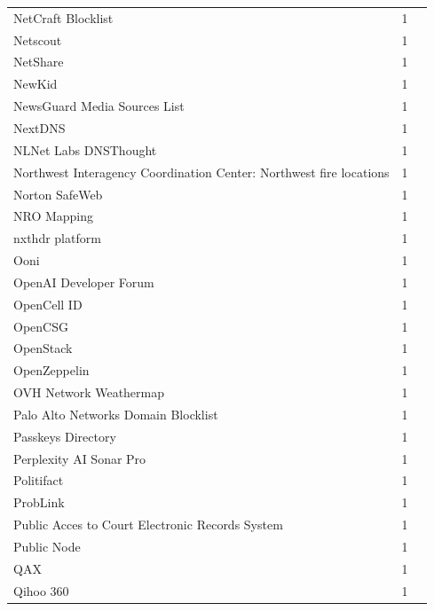 \documentclass[11pt,a4paper]{article}
\begin{document}
\begin{longtable}{@{}p{} p{}p{}@{}}
NetCraft Blocklist & 1 & \cite{10.1007/978-3-030-98785-5_1} \\
Netscout & 1 & \cite{10.1145/3646547.3688451} \\
NetShare & 1 & \cite{10.1145/3777912.3839833} \\
NewKid & 1 & \cite{10.1145/3646547.3688451} \\
NewsGuard Media Sources List & 1 & \cite{10.1145/3487552.3487859} \\
NextDNS & 1 & \cite{10.1145/3730567.3764491} \\
NLNet Labs DNSThought & 1 & \cite{10.1007/978-3-031-28486-1_21} \\
Northwest Interagency Coordination Center: Northwest fire locations & 1 & \cite{10.1007/978-3-031-56252-5_9} \\
Norton SafeWeb & 1 & \cite{10.1145/3777912.3839787} \\
NRO Mapping & 1 & \cite{10.1145/3777912.3809139} \\
nxthdr platform & 1 & \cite{10.1145/3777912.3839828} \\
Ooni & 1 & \cite{10.1007/978-3-030-98785-5_23} \\
OpenAI Developer Forum & 1 & \cite{10.1145/3730567.3732912} \\
OpenCell ID & 1 & \cite{10.1007/978-3-030-72582-2_15} \\
OpenCSG & 1 & \cite{10.1145/3777912.3839799} \\
OpenStack & 1 & \cite{10.1007/978-3-032-18268-5_16} \\
OpenZeppelin & 1 & \cite{10.1145/3777912.3809150} \\
OVH Network Weathermap & 1 & \cite{10.1145/3517745.3561462} \\
Palo Alto Networks Domain Blocklist & 1 & \cite{10.1145/3618257.3624805} \\
Passkeys Directory & 1 & \cite{10.1007/978-3-032-18268-5_15} \\
Perplexity AI Sonar Pro & 1 & \cite{10.1145/3777912.3809155} \\
Politifact & 1 & \cite{10.1145/3487552.3487850} \\
ProbLink & 1 & \cite{10.1145/3487552.3487825} \\
Public Acces to Court Electronic Records System & 1 & \cite{10.1145/3777912.3839786} \\
Public Node & 1 & \cite{10.1145/3777912.3839782} \\
QAX & 1 & \cite{10.1145/3618257.3624839} \\
Qihoo 360 & 1 & \cite{10.1007/978-3-031-56249-5_6} \\

\end{longtable}
\end{document}
